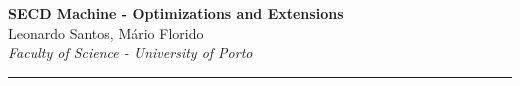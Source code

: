 \documentclass[a4paper,12pt]{article}
\begin{document}
\pagestyle{fancy}
\thispagestyle{empty}
\fancyhead[L]{}
\renewcommand*{\thefootnote}{\fnsymbol{footnote}}
\begin{center}
\Large{\textbf{SECD Machine - Optimizations and Extensions}}
\vspace{0.4cm}
\normalsize
\\ Leonardo Santos, Mário Florido \\
\vspace{0.1cm}
\textit{Faculty of Science - University of Porto}
\medskip
\normalsize
\end{center}
{\color{gray}\hrule}
\medskip

\newpage

\newpage

\newpage

\newpage

\newpage

\nocite{KoggeASC}

{}
\end{document}
